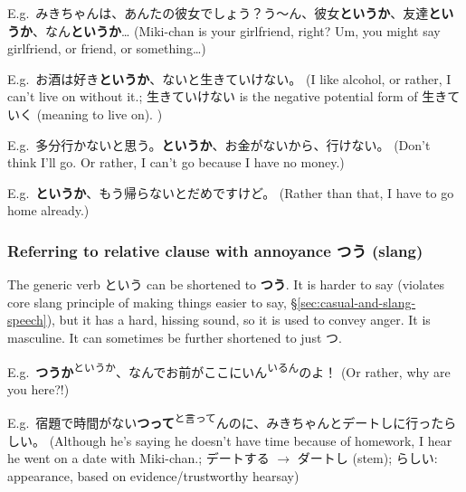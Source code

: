 \documentclass[../nihongo-gakushuu-kyouzai.tex]{subfiles}
\begin{document}
E.g.\ みきちゃんは、あんたの彼女でしょう？う〜ん、彼女\textbf{というか}、友達\textbf{というか}、なん\textbf{というか}\dots{} (Miki-chan is your girlfriend, right? Um, you might say girlfriend, or friend, or something\dots)

E.g.\ お酒は好き\textbf{というか}、ないと生きていけない。 (I like alcohol, or rather, I can't live on without it.; 生きていけない is the negative potential form of 生きていく (meaning to live on).  )

E.g.\ 多分行かないと思う。\textbf{というか}、お金がないから、行けない。 (Don't think I'll go. Or rather, I can't go because I have no money.)

E.g.\ \textbf{というか}、もう帰らないとだめですけど。 (Rather than that, I have to go home already.)


\subsubsection{Referring to relative clause with annoyance つう (slang)} \label{sec:referring-to-relative-clause-annoyance-slang}
The generic verb という can be shortened to \textbf{つう}. It is harder to say (violates core slang principle of making things easier to say, \S\ref{sec:casual-and-slang-speech}), but it has a hard, hissing sound, so it is used to convey anger. It is masculine. It can sometimes be further shortened to just つ. 

E.g.\ \textbf{つうか}\textsuperscript{というか}、なんでお前がここにいん\textsuperscript{いるん}のよ！ (Or rather, why are you here?!)

E.g.\ 宿題で時間がない\textbf{つって}\textsuperscript{と言って}んのに、みきちゃんとデートしに行ったらしい。 (Although he's saying he doesn't have time because of homework, I hear he went on a date with Miki-chan.; デートする $\to$ ダートし (stem); らしい: appearance, based on evidence/trustworthy hearsay)
\end{document}
